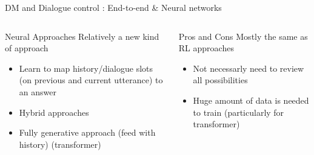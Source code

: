 \documentclass[10pt,aspectratio=169]{beamer}
\begin{document}
\begin{frame}{DM and Dialogue control : End-to-end \& Neural networks}
    \begin{columns}
        \begin{column}{0.5\textwidth}
                \begin{block}{Neural Approaches}
                    Relatively a new kind of approach \cite{wen-2016-network}
                    \begin{itemize}
                        \item Learn to map history/dialogue slots (on previous and current utterance) to an answer 
                        \item Hybrid approaches \cite{williams-etal-2017-hybrid, HAM201980}
                        \item Fully generative approach (feed with history) \cite{yang_2021_toward}(transformer)
                    \end{itemize}
                \end{block}
            
            \end{column}
        \begin{column}{0.5\textwidth}
                        \begin{block}{Pros and Cons}
                        Mostly the same as RL approaches
                \begin{itemize}
                    \item Not necessarly need to review all possibilities 
                    \item Huge amount of data is needed to train (particularly for transformer)
                \end{itemize}
            \end{block}
        \end{column}
    \end{columns}
\end{frame}
\end{document}
